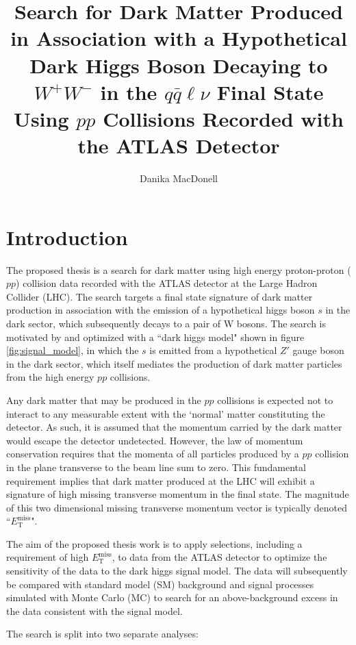 \documentclass[12pt]{article}
\author{Danika MacDonell}
\title{Search for Dark Matter Produced in Association with a Hypothetical Dark Higgs Boson Decaying to $W^+W^-$ in the $q\bar{q}\ell\nu$ Final State Using $pp$ Collisions Recorded with the ATLAS Detector}
\newcommand*{\met}{\ensuremath{E_\text{T}^\text{miss}}}
\begin{document}
\maketitle

\section{Introduction}

The proposed thesis is a search for dark matter using high energy proton-proton ($pp$) collision data recorded with the ATLAS detector at the Large Hadron Collider (LHC). The search targets a final state signature of dark matter production in association with the emission of a hypothetical higgs boson $s$ in the dark sector, which subsequently decays to a pair of W bosons. The search is motivated by and optimized with a ``dark higgs model" \cite{dark_higgs} shown in figure \ref{fig:signal_model}, in which the $s$ is emitted from a hypothetical $Z'$ gauge boson in the dark sector, which itself mediates the production of dark matter particles from the high energy $pp$ collisions.

Any dark matter that may be produced in the $pp$ collisions is expected not to interact to any measurable extent with the `normal' matter constituting the detector. As such, it is assumed that the momentum carried by the dark matter would escape the detector undetected. However, the law of momentum conservation requires that the momenta of all particles produced by a $pp$ collision in the plane transverse to the beam line sum to zero. This fundamental requirement implies that dark matter produced at the LHC will exhibit a signature of high missing transverse momentum in the final state. The magnitude of this two dimensional missing transverse momentum vector is typically denoted ``\met". 

The aim of the proposed thesis work is to apply selections, including a requirement of high \met, to data from the ATLAS detector to optimize the sensitivity of the data to the dark higgs signal model. The data will subsequently be compared with standard model (SM) background and signal processes simulated with Monte Carlo (MC) to search for an above-background excess in the data consistent with the signal model. 

The search is split into two separate analyses:
\end{document}
